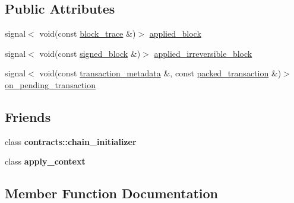 \subsection*{Public Attributes}
\begin{DoxyCompactItemize}
\item 
signal$<$ void(const \mbox{\hyperlink{structaacio_1_1chain_1_1block__trace}{block\+\_\+trace}} \&)$>$ \mbox{\hyperlink{classaacio_1_1chain_1_1chain__controller_adc108094f81f4cc535d3927e97be1d4a}{applied\+\_\+block}}
\item 
signal$<$ void(const \mbox{\hyperlink{structaacio_1_1chain_1_1signed__block}{signed\+\_\+block}} \&)$>$ \mbox{\hyperlink{classaacio_1_1chain_1_1chain__controller_a7f1e1bd702485d5028ca8378d91cc828}{applied\+\_\+irreversible\+\_\+block}}
\item 
signal$<$ void(const \mbox{\hyperlink{classaacio_1_1chain_1_1transaction__metadata}{transaction\+\_\+metadata}} \&, const \mbox{\hyperlink{structaacio_1_1chain_1_1packed__transaction}{packed\+\_\+transaction}} \&)$>$ \mbox{\hyperlink{classaacio_1_1chain_1_1chain__controller_ab1f8e21220b27a47ce3ed85bf8415497}{on\+\_\+pending\+\_\+transaction}}
\end{DoxyCompactItemize}
\subsection*{Friends}
\begin{DoxyCompactItemize}
\item 
\mbox{\label{classaacio_1_1chain_1_1chain__controller_adf0f148c7eee0aefe6423d9e818780bd}} 
class {\bfseries contracts\+::chain\+\_\+initializer}
\item 
\mbox{\label{classaacio_1_1chain_1_1chain__controller_a7b669aea7e7e49e2cd5f5eff2e8ca927}} 
class {\bfseries apply\+\_\+context}
\end{DoxyCompactItemize}


\subsection{Member Function Documentation}
\mbox{\label{classaacio_1_1chain_1_1chain__controller_a03b5b87487b63dba3295f4b802053380}} 
